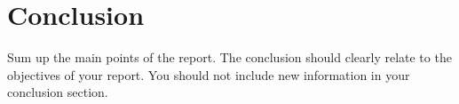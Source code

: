\chapter{Conclusion}
Sum up the main points of the report. The conclusion should clearly relate to the objectives of your report. You should not include new information in your conclusion section.
